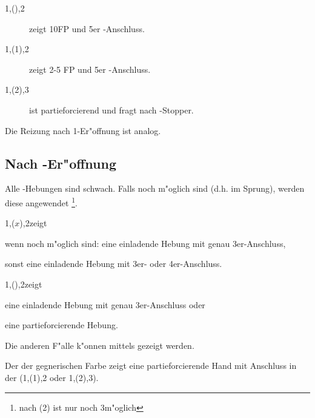 \begin{description}
\item[1\kar{}\sep(\kontra){}\sep2\kar] zeigt 10\pl FP und 5\pl{}er
  \ka-Anschluss.
\item[1\tre{}\sep(1\pik){}\sep2\SA] zeigt 2-5 FP und 5\pl{}er
  \tr-Anschluss.
\item[1\kar{}\sep(2\tre){}\sep3\tre] ist partieforcierend und fragt nach
  \tr-Stopper.
\end{description}

Die Reizung nach 1\kar-Er"offnung ist analog.

\subsection{Nach \of-Er"offnung}
\begin{compactitem}
\item Alle \ofa-Hebungen sind schwach.  Falls 
  noch m"oglich sind (d.h. im Sprung), werden diese angewendet%
  \footnote{nach (2\tre) ist nur noch 3\kar m"oglich}.
\item 1\of{}\sep($x$){}\sep2\SA zeigt
  \begin{compactitem}
  \item wenn  noch m"oglich sind: eine einladende
    Hebung mit genau 3er-Anschluss,
  \item sonst eine einladende Hebung mit 3er- oder 4er-Anschluss.
  \end{compactitem}
\item 1\of{}\sep(\kontra){}\sep2\SA zeigt
  \begin{compactitem}
    \item eine einladende Hebung mit genau 3er-Anschluss oder
    \item eine partieforcierende Hebung.
  \end{compactitem}
Die anderen F"alle k"onnen mittels  gezeigt werden.
\item Der  der gegnerischen Farbe zeigt eine
  partieforcierende Hand mit Anschluss in der \ofa
  (1\of{}\sep(1\anybid){}\sep2\anybid{} oder 1\of{}\sep(2\anybid){}\sep3\anybid{}).
\end{compactitem}


